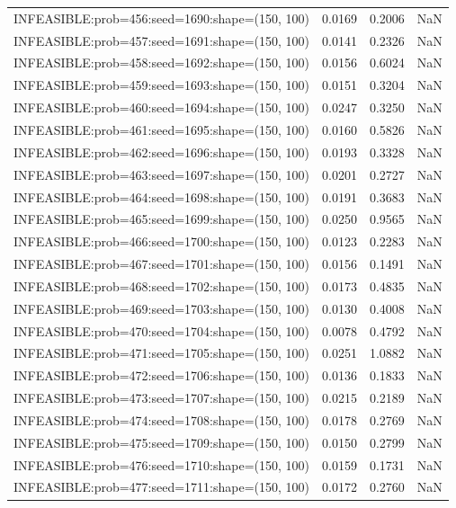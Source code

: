 \begin{longtable}{lccc}
INFEASIBLE:prob=456:seed=1690:shape=(150, 100) &   0.0169 &  0.2006 &    NaN \\
INFEASIBLE:prob=457:seed=1691:shape=(150, 100) &   0.0141 &  0.2326 &    NaN \\
INFEASIBLE:prob=458:seed=1692:shape=(150, 100) &   0.0156 &  0.6024 &    NaN \\
INFEASIBLE:prob=459:seed=1693:shape=(150, 100) &   0.0151 &  0.3204 &    NaN \\
INFEASIBLE:prob=460:seed=1694:shape=(150, 100) &   0.0247 &  0.3250 &    NaN \\
INFEASIBLE:prob=461:seed=1695:shape=(150, 100) &   0.0160 &  0.5826 &    NaN \\
INFEASIBLE:prob=462:seed=1696:shape=(150, 100) &   0.0193 &  0.3328 &    NaN \\
INFEASIBLE:prob=463:seed=1697:shape=(150, 100) &   0.0201 &  0.2727 &    NaN \\
INFEASIBLE:prob=464:seed=1698:shape=(150, 100) &   0.0191 &  0.3683 &    NaN \\
INFEASIBLE:prob=465:seed=1699:shape=(150, 100) &   0.0250 &  0.9565 &    NaN \\
INFEASIBLE:prob=466:seed=1700:shape=(150, 100) &   0.0123 &  0.2283 &    NaN \\
INFEASIBLE:prob=467:seed=1701:shape=(150, 100) &   0.0156 &  0.1491 &    NaN \\
INFEASIBLE:prob=468:seed=1702:shape=(150, 100) &   0.0173 &  0.4835 &    NaN \\
INFEASIBLE:prob=469:seed=1703:shape=(150, 100) &   0.0130 &  0.4008 &    NaN \\
INFEASIBLE:prob=470:seed=1704:shape=(150, 100) &   0.0078 &  0.4792 &    NaN \\
INFEASIBLE:prob=471:seed=1705:shape=(150, 100) &   0.0251 &  1.0882 &    NaN \\
INFEASIBLE:prob=472:seed=1706:shape=(150, 100) &   0.0136 &  0.1833 &    NaN \\
INFEASIBLE:prob=473:seed=1707:shape=(150, 100) &   0.0215 &  0.2189 &    NaN \\
INFEASIBLE:prob=474:seed=1708:shape=(150, 100) &   0.0178 &  0.2769 &    NaN \\
INFEASIBLE:prob=475:seed=1709:shape=(150, 100) &   0.0150 &  0.2799 &    NaN \\
INFEASIBLE:prob=476:seed=1710:shape=(150, 100) &   0.0159 &  0.1731 &    NaN \\
INFEASIBLE:prob=477:seed=1711:shape=(150, 100) &   0.0172 &  0.2760 &    NaN \\

\end{longtable}
